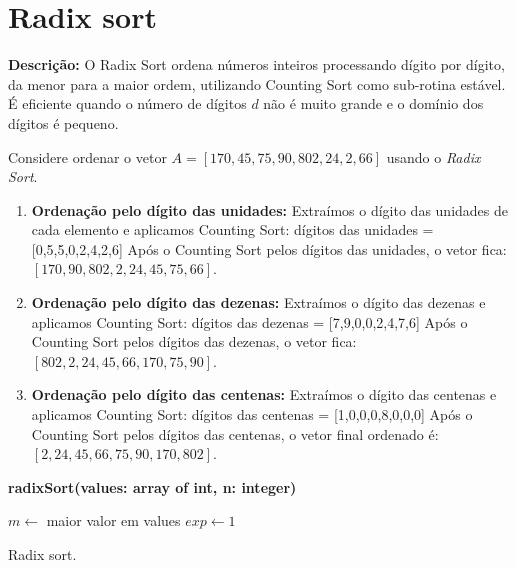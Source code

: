 \section{Radix sort}
\textbf{Descrição:} O Radix Sort ordena números inteiros processando dígito por dígito, da menor para a maior ordem, utilizando Counting Sort como sub-rotina estável. É eficiente quando o número de dígitos $d$ não é muito grande e o domínio dos dígitos é pequeno.

\begin{exmp}
Considere ordenar o vetor $A = [170, 45, 75, 90, 802, 24, 2, 66]$ usando o \textit{Radix Sort}.  

\begin{enumerate}
    \item \textbf{Ordenação pelo dígito das unidades:}  
    Extraímos o dígito das unidades de cada elemento e aplicamos Counting Sort:  
    dígitos das unidades = [0,5,5,0,2,4,2,6]  
    Após o Counting Sort pelos dígitos das unidades, o vetor fica: $[170, 90, 802, 2, 24, 45, 75, 66]$.

    \item \textbf{Ordenação pelo dígito das dezenas:}  
    Extraímos o dígito das dezenas e aplicamos Counting Sort:  
    dígitos das dezenas = [7,9,0,0,2,4,7,6]  
    Após o Counting Sort pelos dígitos das dezenas, o vetor fica: $[802, 2, 24, 45, 66, 170, 75, 90]$.

    \item \textbf{Ordenação pelo dígito das centenas:}  
    Extraímos o dígito das centenas e aplicamos Counting Sort:  
    dígitos das centenas = [1,0,0,0,8,0,0,0]  
    Após o Counting Sort pelos dígitos das centenas, o vetor final ordenado é: $[2, 24, 45, 66, 75, 90, 170, 802]$.
\end{enumerate}
\end{exmp}


\begin{center}
\begin{minipage}{.9\linewidth}
\begin{algorithm}[H]
\DontPrintSemicolon
\textbf{radixSort(values: array of int, n: integer)}

$m \gets$ maior valor em values\;
$exp \gets 1$\;
\caption{Radix sort.}
\label{lab:alg-radixSort}
\end{algorithm}
\end{minipage}
\end{center}

